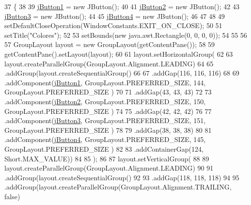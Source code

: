 \begin{DoxyCode}
37                                   \{
38 
39         \mbox{\hyperlink{class_ejercicio1__3_1_1_ventana_a9c2a8cc20df43585485cd2f6f7d54a03}{jButton1}} = \textcolor{keyword}{new} JButton();
40 
41         \mbox{\hyperlink{class_ejercicio1__3_1_1_ventana_a53161bde48e247e8ea1ea2bc6474ec97}{jButton2}} = \textcolor{keyword}{new} JButton();
42 
43         \mbox{\hyperlink{class_ejercicio1__3_1_1_ventana_a41e3718d7909beec7776b977e931a53e}{jButton3}} = \textcolor{keyword}{new} JButton();
44 
45         \mbox{\hyperlink{class_ejercicio1__3_1_1_ventana_a06b0fc7e1c5922e1e6804014d6e3c061}{jButton4}} = \textcolor{keyword}{new} JButton();
46 
47  
48 
49         setDefaultCloseOperation(WindowConstants.EXIT\_ON\_CLOSE);
50 
51         setTitle(\textcolor{stringliteral}{"Colores"});
52 
53         setBounds(\textcolor{keyword}{new} java.awt.Rectangle(0, 0, 0, 0));
54 
55  
56 
57         GroupLayout layout = \textcolor{keyword}{new} GroupLayout(getContentPane());
58 
59         getContentPane().setLayout(layout);
60 
61         layout.setHorizontalGroup(
62 
63             layout.createParallelGroup(GroupLayout.Alignment.LEADING)
64 
65             .addGroup(layout.createSequentialGroup()
66 
67                 .addGap(116, 116, 116)
68 
69                 .addComponent(\mbox{\hyperlink{class_ejercicio1__3_1_1_ventana_a9c2a8cc20df43585485cd2f6f7d54a03}{jButton1}}, GroupLayout.PREFERRED\_SIZE, 144, GroupLayout.PREFERRED\_SIZE
      )
70 
71                 .addGap(43, 43, 43)
72 
73                 .addComponent(\mbox{\hyperlink{class_ejercicio1__3_1_1_ventana_a53161bde48e247e8ea1ea2bc6474ec97}{jButton2}}, GroupLayout.PREFERRED\_SIZE, 150, GroupLayout.PREFERRED\_SIZE
      )
74 
75                 .addGap(42, 42, 42)
76 
77                 .addComponent(\mbox{\hyperlink{class_ejercicio1__3_1_1_ventana_a41e3718d7909beec7776b977e931a53e}{jButton3}}, GroupLayout.PREFERRED\_SIZE, 151, GroupLayout.PREFERRED\_SIZE
      )
78 
79                 .addGap(38, 38, 38)
80 
81                 .addComponent(\mbox{\hyperlink{class_ejercicio1__3_1_1_ventana_a06b0fc7e1c5922e1e6804014d6e3c061}{jButton4}}, GroupLayout.PREFERRED\_SIZE, 145, GroupLayout.PREFERRED\_SIZE
      )
82 
83                 .addContainerGap(124, Short.MAX\_VALUE))
84 
85         );
86 
87         layout.setVerticalGroup(
88 
89             layout.createParallelGroup(GroupLayout.Alignment.LEADING)
90 
91             .addGroup(layout.createSequentialGroup()
92 
93                 .addGap(118, 118, 118)
94 
95                 .addGroup(layout.createParallelGroup(GroupLayout.Alignment.TRAILING, \textcolor{keyword}{false})

\end{DoxyCode}
